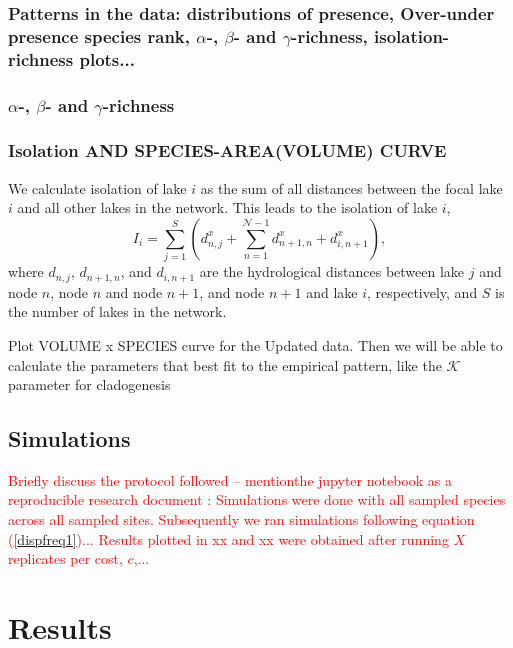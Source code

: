 \documentclass[12pt]{article}
\newcommand{\carlos}[1]{\textcolor{Red}{#1}}
\begin{document}
\subsubsection{Patterns in the data: distributions of presence, Over-under presence species rank, $\alpha$-, $\beta$- and $\gamma$-richness, isolation-richness plots...}

\subsubsection{$\alpha$-, $\beta$- and $\gamma$-richness}


\subsubsection{Isolation AND SPECIES-AREA(VOLUME) CURVE}

We calculate isolation of lake $i$ as the sum of all distances between
the focal lake $i$ and all other lakes in the network. This leads to
the isolation of lake $i$,
\begin{equation}
I_{i} =  \sum_{j=1}^{S} \left(d_{n,j}^{x} + \sum\limits_{n = 1}^{\mathcal{N}-1} d_{n+1,n}^{x} + d_{i,n+1}^{x}\right),
\label{dispfreq2}
\end{equation}
where $d_{n,j}$, $d_{n+1,n}$, and $d_{i,n+1}$ are the hydrological
distances between lake $j$ and node $n$, node $n$ and node $n+1$, and
node $n+1$ and lake $i$, respectively, and $S$ is the number of lakes
in the network.

Plot VOLUME x SPECIES curve for the Updated data. Then we will be able to calculate the parameters that best fit to the empirical pattern, like the $\mathcal{K}$ parameter for cladogenesis


\subsection{Simulations}

\carlos{Briefly discuss the protocol followed -- mentionthe jupyter notebook as a reproducible research document
:
Simulations were done with all sampled species across all sampled sites. Subsequently we ran simulations following equation (\ref{dispfreq1})...
Results plotted in xx and xx were obtained after running $X$
replicates per cost, $c$,...}

\section{Results}
\end{document}
